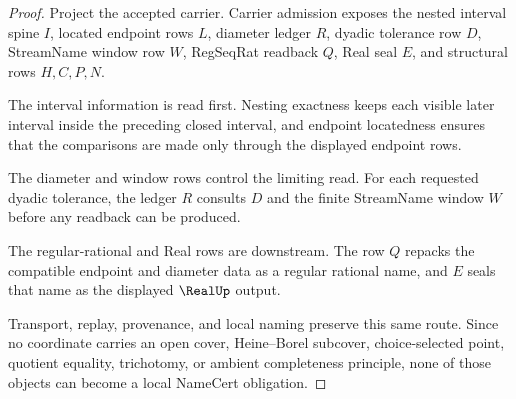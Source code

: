 \begin{proof}
Project the accepted carrier. Carrier admission exposes the nested interval spine $I$, located endpoint rows $L$, diameter ledger $R$, dyadic tolerance row $D$, StreamName window row $W$, RegSeqRat readback $Q$, Real seal $E$, and structural rows $H,C,P,N$.

The interval information is read first. Nesting exactness keeps each visible later interval inside the preceding closed interval, and endpoint locatedness ensures that the comparisons are made only through the displayed endpoint rows.

The diameter and window rows control the limiting read. For each requested dyadic tolerance, the ledger $R$ consults $D$ and the finite StreamName window $W$ before any readback can be produced.

The regular-rational and Real rows are downstream. The row $Q$ repacks the compatible endpoint and diameter data as a regular rational name, and $E$ seals that name as the displayed $\RealUp$ output.

Transport, replay, provenance, and local naming preserve this same route. Since no coordinate carries an open cover, Heine--Borel subcover, choice-selected point, quotient equality, trichotomy, or ambient completeness principle, none of those objects can become a local NameCert obligation.
\end{proof}


